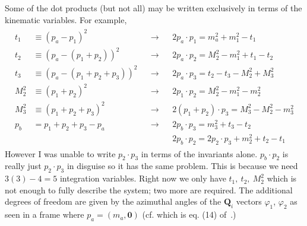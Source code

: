 
Some of the dot products (but not all) may be written exclusively in terms of the kinematic variables. For example,
\begin{gather*}
    \begin{align*}
        t_1 &\equiv (p_a - p_1)^2 &&\rightarrow 
            && 2 p_a \cdot p_1 = m_a^2 +  m_1^2 - t_1 \\
        t_2 &\equiv (p_a - (p_1 + p_2))^2 &&\rightarrow 
            && 2 p_a \cdot p_2 = M_2^2 - m_1^2 + t_1 - t_2 \\
        t_3 &\equiv (p_a - (p_1 + p_2 + p_3))^2 &&\rightarrow 
            && 2 p_a \cdot p_3 = t_2 - t_3 - M_2^2 + M_3^2 \\
        M_2^2 &\equiv (p_1 + p_2)^2 &&\rightarrow 
            && 2 p_1 \cdot p_2 = M_2^2 - m_1^2 - m_2^2 \\
        M_3^2 &\equiv (p_1 + p_2 + p_3)^2 &&\rightarrow 
            && 2 (p_1 + p_2) \cdot p_3 = M_3^2 - M_2^2 - m_3^2 \\
        p_b &= p_1 + p_2 + p_3 - p_a &&\rightarrow
            && 2p_b \cdot p_3 = m_3^2 + t_3 - t_2 \\
        & && && 2p_b \cdot p_2 = 2 p_2 \cdot p_3 + m_2^2 + t_2 - t_1
    \end{align*}
\end{gather*}
However I was unable to write $p_2 \cdot p_3$ in terms of the invariants alone. 
$p_b \cdot p_2$ is really just $p_2 \cdot p_3$ in disguise so it has the same problem.
This is because we need $3(3) - 4 = 5$ integration variables. Right now we only have $t_1,\ t_2,\ M_2^2$ which is not enough to fully describe the system; two more are required. 
The additional degrees of freedom are given by the azimuthal angles of the $\bm{Q}_i$ vectors $\varphi_1$, $\varphi_2$ as seen in a frame where $p_a = (m_a, \bm{0})$ (cf.  which is eq. (14) of~\cite{Byckling:1969sx}.)

